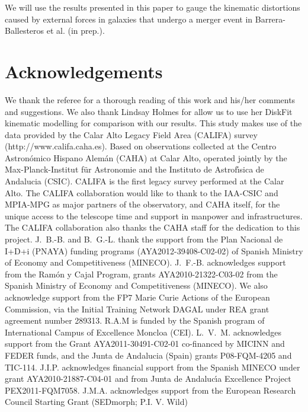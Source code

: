 \documentclass[longauth,traditabstract]{aa}
\begin{document}
We will use the results presented in this paper to gauge the kinematic 
distortions caused by external forces in galaxies that undergo a merger event in Barrera-Ballesteros et al. (in prep.).  


\section*{Acknowledgements}
We thank the referee for a thorough reading of this work and his/her comments and suggestions. We also thank Lindsay Holmes for allow us to use her DiskFit kinematic modelling for comparison with our results. This study makes use of the data provided by the Calar Alto Legacy Field Area (CALIFA) survey (http://www.califa.caha.es). Based on observations collected at the Centro Astron\'{o}mico Hispano Alem\'{a}n (CAHA) at Calar Alto, operated jointly by the Max-Planck-Institut f\"{u}r Astronomie and the Instituto de Astrof\'{\i}sica de Andalucia (CSIC). CALIFA is the first legacy survey performed at the Calar Alto. The CALIFA collaboration would like to thank to the IAA-CSIC and MPIA-MPG as major partners of the observatory, and CAHA itself, for the unique access to the telescope time and support  in manpower and infrastructures. The CALIFA collaboration also thanks the CAHA staff for the dedication to this project. J.~B.-B. and B.~G.-L. thank the support from the Plan Nacional de I+D+i (PNAYA) funding programs (AYA2012-39408-C02-02) of Spanish Ministry of Economy and Competitiveness (MINECO).
%
J.~F.-B. acknowledges support from the Ram\'on y Cajal Program, grants
AYA2010-21322-C03-02 from the Spanish Ministry of Economy and Competitiveness
(MINECO). We also acknowledge support from the FP7 Marie Curie Actions of the
European Commission, via the Initial Training Network DAGAL under REA grant
agreement number 289313. R.A.M is funded by the Spanish program of International Campus of Excellence Moncloa (CEI).
%
L.~V.~M. acknowledges support from the Grant AYA2011-30491-C02-01 co-financed by MICINN and FEDER funds, and the Junta de Andalucia (Spain) grants P08-FQM-4205 and TIC-114.
%
J.I.P. acknowledges financial support from the Spanish MINECO under grant AYA2010-21887-C04-01 and from Junta de
Andaluc\'{\i}a Excellence Project PEX2011-FQM7058.
%
J.M.A. acknowledges support from the European Research Council Starting Grant (SEDmorph; P.I. V. Wild)

 

\end{document}
